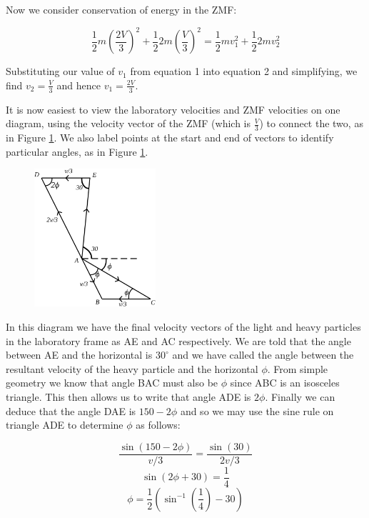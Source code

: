 \begin{problem}
{Now we consider conservation of energy in the ZMF:

\begin{equation}\frac{1}{2}m\left(\frac{2V}{3}\right)^2+\frac{1}{2}2m\left(\frac{V}{3}\right)^2=\frac{1}{2}mv_1^2+\frac{1}{2}2mv_2^2\end{equation}

Substituting our value of $v_1$ from equation 1 into equation 2 and simplifying, we find $v_2=\frac{V}{3}$ and hence $v_1=\frac{2V}{3}$. 

It is now easiest to view the laboratory velocities and ZMF velocities on one diagram, using the velocity vector of the ZMF (which is $\frac{V}{3}$) to connect the two, as in Figure \ref{fig:Tripos_Inelastic_ZMF_3}. We also label points at the start and end of vectors to identify particular angles, as in Figure \ref{fig:Tripos_Inelastic_ZMF_3}. 


\begin{figure}[h]
	\centering
	\includegraphics[width=0.4\textwidth]{../../../figures/Tripos_Inelastic_ZMF_3.svg}
	\caption{}
	\label{fig:Tripos_Inelastic_ZMF_3}
\end{figure}

In this diagram we have the final velocity vectors of the light and heavy particles in the laboratory frame as AE and AC respectively. We are told that the angle between AE and the horizontal is $30^\circ$ and we have called the angle between the resultant velocity of the heavy particle and the horizontal $\phi$. From simple geometry we know that angle BAC must also be $\phi$ since ABC is an isosceles triangle. This then allows us to write that angle ADE is $2\phi$. Finally we can deduce that the angle DAE is $150-2\phi$ and so we may use the sine rule on triangle ADE to determine $\phi$ as follows:

\begin{equation*}\frac{\sin{(150-2\phi)}}{v/3}=\frac{\sin{(30)}}{2v/3}\end{equation*}
\begin{equation*}\sin{(2\phi+30)}=\frac{1}{4}\end{equation*}
\begin{equation*}\phi=\frac{1}{2}(\sin^{-1}{(\frac{1}{4})}-30)\end{equation*}

}
\end{problem}
